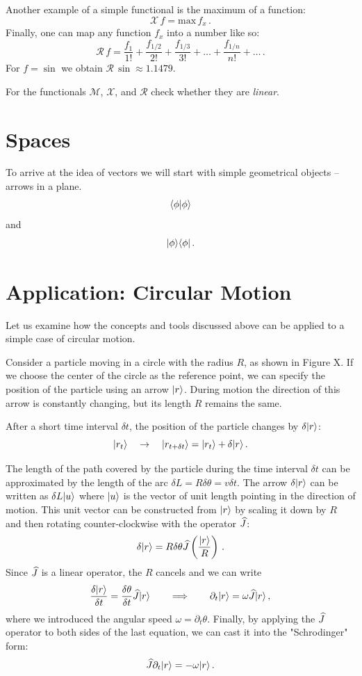 Another example of a simple functional is the maximum of a function:
\[
\mathcal{X}\,f = \textrm{max}\,f_x\,.
\]
Finally, one can map any function $f_x$ into a number like so:
\[
\mathcal{R}\,f = \frac{f_1}{1!} + \frac{f_{1/2}}{2!} + \frac{f_{1/3}}{3!}+\ldots+\frac{f_{1/n}}{n!}+\ldots\,.
\]
For $f=\sin$ we obtain $\mathcal{R}\,\sin\approx 1.1479$.
\begin{exercise}
	For the functionals $\mathcal{M}$, $\mathcal{X}$, and $\mathcal{R}$ check whether they are \emph{linear}.
\end{exercise}

\section{Spaces}

To arrive at the idea of vectors we will start with simple geometrical
objects -- arrows in a plane.
\[
\langle{\phi}|{\phi\rangle}
\]
and
\[
|{\phi}\rangle\langle{\phi}|\,.
\]

\section{Application: Circular Motion}
Let us examine how the concepts and tools discussed above can be applied to a simple case of circular motion.  

Consider a  particle moving in a circle with the radius $R$, as shown in Figure X. If we choose the center of the circle as the reference point, we can specify the position of the particle using an arrow $|{r}\rangle$. During motion the direction of this arrow is constantly changing, but its length $R$ remains the same.  

After a short time interval $\delta t$, the position of the particle changes by $\delta|{r}\rangle$:
\[
|{r_t}\rangle\quad\rightarrow\quad |{r_{t+\delta t}}\rangle = |{r_t}\rangle+\delta|{r}\rangle\,.
\]

The length of the path covered by the particle during the time interval $\delta t$ can be approximated by the length of the arc  $\delta L=R\delta\theta=v\delta t$. The arrow $\delta|{r}\rangle$ can be written as $\delta L|{u}\rangle$ where $|{u}\rangle$ is the vector of unit length pointing in the direction of motion. This unit vector can be constructed from $|{r}\rangle$ by scaling it down by $R$ and then rotating counter-clockwise with the operator $\widehat{J}$: 
\[
\delta|{r}\rangle=R\delta\theta\widehat{J}\left(\frac{|{r}\rangle}{R}\right)\,.
\]
Since $\widehat{J}$ is a linear operator, the $R$ cancels and we can write
\[
\frac{\delta|{r}\rangle}{\delta t}=\frac{\delta\theta}{\delta t}\widehat{J}|{r}\rangle\qquad\Longrightarrow\qquad
\partial_t|{r}\rangle=\omega\widehat{J}|{r}\rangle\,,
\]
where we introduced the angular speed $\omega=\partial_t\theta$. Finally, by applying the $\widehat{J}$ operator to both sides of the last equation, we can cast it into the "Schrodinger" form:
\[
\widehat{J}\partial_t|{r}\rangle=-\omega|{r}\rangle\,.
\]  




